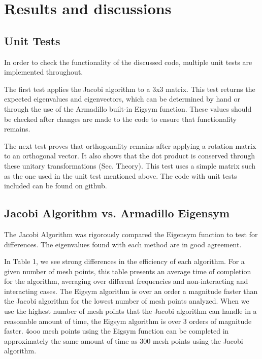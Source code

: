 \documentclass[10pt,showpacs,preprintnumbers,amsmath,amssymb,aps,prl,twocolumn,groupedaddress,superscriptaddress,showkeys]{revtex4-1}
\begin{document}
\section{Results and discussions}
\subsection{Unit Tests}
In order to check the functionality of the discussed code, multiple unit tests are implemented throughout. 

\quad The first test applies the Jacobi algorithm to a 3x3 matrix. This test returns the expected eigenvalues and eigenvectors, which can be determined by hand or through the use of the Armadillo built-in Eigsym function. These values should be checked after changes are made to the code to ensure that functionality remains.

\quad The next test proves that orthogonality remains after applying a rotation matrix to an orthogonal vector. It also shows that the dot product is conserved through these unitary transformations (Sec. Theory). This test uses a simple matrix such as the one used in the unit test mentioned above. The code with unit tests included can be found on github.

\subsection{Jacobi Algorithm vs. Armadillo Eigensym}
The Jacobi Algorithm was rigorously compared the Eigensym function to test for differences. The eigenvalues found with each method are in good agreement. 

\quad In Table 1, we see strong differences in the efficiency of each algorithm. For a given number of mesh points, this table presents an average time of completion for the algorithm, averaging over different frequencies and non-interacting and interacting cases. The Eigsym algorithm is over an order a magnitude faster than the Jacobi algorithm for the lowest number of mesh points analyzed. When we use the highest number of mesh points that the Jacobi algorithm can handle in a reasonable amount of time, the Eigsym algorithm is over 3 orders of magnitude faster. 4ooo mesh points using the Eigsym function can be completed in approximately the same amount of time as 300 mesh points using the Jacobi algorithm.
\end{document}
